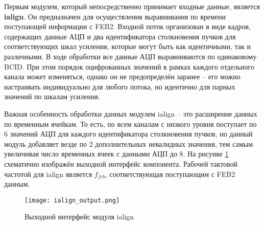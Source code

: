 Первым модулем, который непосредственно принимает входные данные, является \textbf{ialign}. Он предназначен для осуществления выравнивания по времени поступающей информации с FEB2. Входной поток организован в виде кадров, содержащих данные АЦП и два идентификатора столкновения пучков для соответствующих шкал усиления, которые могут быть как идентичными, так и различными. В ходе обработки все данные АЦП выравниваются по одинаковому BCID. При этом порядок оцифрованных значений в рамках каждого отдельного канала может изменяться, однако он не предопределён заранее -- его можно настраивать индивидуально для любого потока, но идентично для парных значений по шкалам усиления.\par
Важная особенность обработки данных модулем ialign -- это расширение данных по временным ячейкам. То есть, по всем каналам с низкого уровня поступает по 6 значений АЦП для каждого идентификатора столкновения пучков, но данный модуль добавляет везде по 2 дополнительных невалидных значения, тем самым увеличивая число временных ячеек с данными АЦП до 8. На рисунке \ref{fig:ialign_output} схематично изображён выходной интерфейс компонента. Рабочей тактовой частотой для ialign является $f_{feb}$, соответствующая поступающим с FEB2 данным.

\begin{figure}[ht]
    \centering
    \texttt{[image: ialign\_output.png]}
    \caption{Выходной интерфейс модуля ialign}
    \label{fig:ialign_output}
\end{figure}\par


